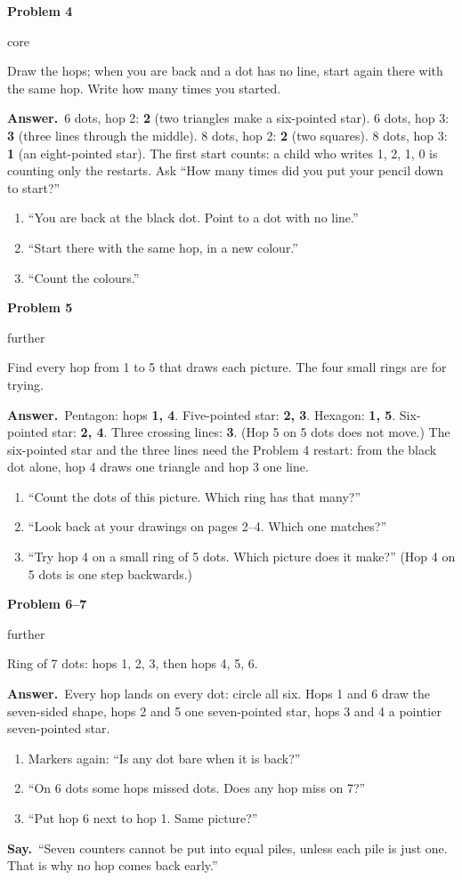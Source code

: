 \documentclass[11pt]{article}
\newcommand{\lbl}[1]{\colorbox{black!10}{\footnotesize\strut #1}}
\newcommand{\core}{\lbl{core}}
\newcommand{\further}{\lbl{further}}
\newcommand{\pb}[3]{\par\needspace{4\baselineskip}\vspace{3pt}\noindent\textbf{Problem #1}\enspace #2\enspace #3\par}
\newcommand{\ans}{\textbf{Answer.}\ }
\newcommand{\say}{\textbf{Say.}\ }
\newenvironment{hints}{\begin{enumerate}[label={\textit{Hint \arabic*.}}, leftmargin=*, align=left]}{\end{enumerate}}
\begin{document}
\pb{4}{\core}{Draw the hops; when you are back and a dot has no line, start again there with the same hop.
Write how many times you started.}
\ans 6 dots, hop 2: \textbf{2} (two triangles make a six-pointed star). 6 dots, hop 3: \textbf{3} (three lines
through the middle). 8 dots, hop 2: \textbf{2} (two squares). 8 dots, hop 3: \textbf{1} (an eight-pointed star).
The first start counts: a child who writes 1, 2, 1, 0 is counting only the restarts. Ask ``How many times did you
put your pencil down to start?''
\begin{hints}
\item ``You are back at the black dot. Point to a dot with no line.''
\item ``Start there with the same hop, in a new colour.''
\item ``Count the colours.''
\end{hints}

\pb{5}{\further}{Find every hop from 1 to 5 that draws each picture. The four small rings are for trying.}
\ans Pentagon: hops \textbf{1, 4}. Five-pointed star: \textbf{2, 3}. Hexagon: \textbf{1, 5}. Six-pointed star:
\textbf{2, 4}. Three crossing lines: \textbf{3}. (Hop 5 on 5 dots does not move.) The six-pointed star and the
three lines need the Problem 4 restart: from the black dot alone, hop 4 draws one triangle and hop 3 one line.
\begin{hints}
\item ``Count the dots of this picture. Which ring has that many?''
\item ``Look back at your drawings on pages 2--4. Which one matches?''
\item ``Try hop 4 on a small ring of 5 dots. Which picture does it make?'' (Hop 4 on 5 dots is one step backwards.)
\end{hints}

\pb{6--7}{\further}{Ring of 7 dots: hops 1, 2, 3, then hops 4, 5, 6.}
\ans Every hop lands on every dot: circle all six. Hops 1 and 6 draw the seven-sided shape, hops 2 and 5 one
seven-pointed star, hops 3 and 4 a pointier seven-pointed star.
\begin{hints}
\item Markers again: ``Is any dot bare when it is back?''
\item ``On 6 dots some hops missed dots. Does any hop miss on 7?''
\item ``Put hop 6 next to hop 1. Same picture?''
\end{hints}
\say ``Seven counters cannot be put into equal piles, unless each pile is just one. That is why no hop comes back
early.''
\end{document}
